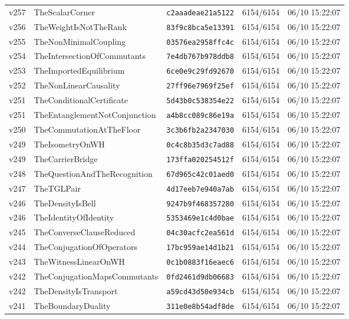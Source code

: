 \documentclass[11pt]{article}
\theoremstyle{definition}\newtheorem{deriv}{Derivation}
\begin{document}
{\begin{longtable}{@{}lllll@{}}
v257 & TheScalarCorner & \texttt{c2aaadeae21a5122} & 6154/6154 & 06/10 15:22:07 \\
v256 & TheWeightIsNotTheRank & \texttt{83f9c8bca5e13391} & 6154/6154 & 06/10 15:22:07 \\
v255 & TheNonMinimalCoupling & \texttt{03576ea2958ffc4c} & 6154/6154 & 06/10 15:22:07 \\
v254 & TheIntersectionOfCommutants & \texttt{7e4db767b978ddb8} & 6154/6154 & 06/10 15:22:07 \\
v253 & TheImportedEquilibrium & \texttt{6ce0e9c29fd92670} & 6154/6154 & 06/10 15:22:07 \\
v252 & TheNonLinearCausality & \texttt{27ff96e7969f25ef} & 6154/6154 & 06/10 15:22:07 \\
v251 & TheConditionalCertificate & \texttt{5d43b0c538354e22} & 6154/6154 & 06/10 15:22:07 \\
v251 & TheEntanglementNotConjunction & \texttt{a4b8cc089c86e19a} & 6154/6154 & 06/10 15:22:07 \\
v250 & TheCommutationAtTheFloor & \texttt{3c3b6fb2a2347030} & 6154/6154 & 06/10 15:22:07 \\
v249 & TheIsometryOnWH & \texttt{0c4c8b35d3c7ad88} & 6154/6154 & 06/10 15:22:07 \\
v249 & TheCarrierBridge & \texttt{173ffa020254512f} & 6154/6154 & 06/10 15:22:07 \\
v248 & TheQuestionAndTheRecognition & \texttt{67d965c42c01aed0} & 6154/6154 & 06/10 15:22:07 \\
v247 & TheTGLPair & \texttt{4d17eeb7e940a7ab} & 6154/6154 & 06/10 15:22:07 \\
v246 & TheDensityIsBell & \texttt{9247b9f468357280} & 6154/6154 & 06/10 15:22:07 \\
v246 & TheIdentityOfIdentity & \texttt{5353469e1c4d0bae} & 6154/6154 & 06/10 15:22:07 \\
v245 & TheConverseClauseReduced & \texttt{04c30acfc2ea561d} & 6154/6154 & 06/10 15:22:07 \\
v244 & TheConjugationOfOperators & \texttt{17bc959ae14d1b21} & 6154/6154 & 06/10 15:22:07 \\
v243 & TheWitnessLinearOnWH & \texttt{0c1b0883f16eaec6} & 6154/6154 & 06/10 15:22:07 \\
v242 & TheConjugationMapsCommutants & \texttt{0fd2461d9db06683} & 6154/6154 & 06/10 15:22:07 \\
v242 & TheDensityIsTransport & \texttt{a59cd43d50e934cb} & 6154/6154 & 06/10 15:22:07 \\
v241 & TheBoundaryDuality & \texttt{311e0e8b54adf8de} & 6154/6154 & 06/10 15:22:07 \\

\end{longtable}}
\end{document}
